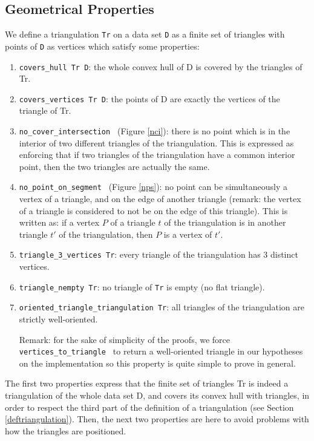 \documentclass[a4paper,10pt]{article}
\def\ttt#1#2{{\tt{\color{black}#1} #2}}
\begin{document}
\subsection{Geometrical Properties}
\label{definition_triangulation}
We define a triangulation {\tt Tr} on a data set {\tt D} as a finite set of triangles with points of {\tt D} as vertices which satisfy some properties:
\begin{enumerate}
\item \ttt{covers\_hull}{Tr D}: the whole convex hull of D is covered by the triangles of Tr.
\item \ttt{covers\_vertices}{Tr D}: the points of D are exactly the vertices of the triangle of Tr.
\item \ttt{no\_cover\_intersection}{} (Figure \ref{nci}): there is no point which is in the interior of two different triangles of the triangulation. This is expressed as enforcing that if two triangles of the triangulation have a common interior point, then the two triangles are actually the same.
  \item\ttt{no\_point\_on\_segment}{} (Figure \ref{nps}): no point can be simultaneously a vertex of a triangle, and on the edge of another triangle (remark: the vertex of a triangle is considered to not be on the edge of this triangle). This is written as: if a vertex $P$ of a triangle $t$ of the triangulation is in another triangle $t'$ of the triangulation, then $P$ is a vertex of $t'$.
\item \ttt{triangle\_3\_vertices}{Tr}: every triangle of the triangulation has 3 distinct vertices.
\item \ttt{triangle\_nempty}{Tr}: no triangle of {\tt Tr} is empty (no flat triangle).
\item \ttt{oriented\_triangle\_triangulation}{Tr}: all triangles of the triangulation are strictly well-oriented.

  Remark: for the sake of simplicity of the proofs, we force \ttt{vertices\_to\_triangle}{} to return a well-oriented triangle in our hypotheses on the implementation so this property is quite simple to prove in general.
\end{enumerate}
The first two properties express that the finite set of triangles Tr is indeed a triangulation of the whole data set D, and covers its convex hull with triangles, in order to respect the third part of the definition of a triangulation (see Section \ref{deftriangulation}).
Then, the next two properties are here to avoid problems with how the triangles are positioned.
\end{document}
